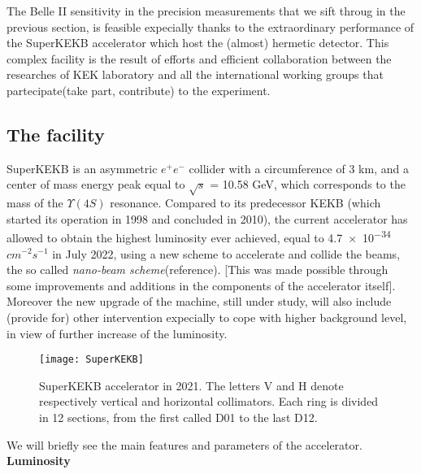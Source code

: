 
The Belle II sensitivity in the precision measurements that we sift throug in the previous section, is feasible expecially thanks to the extraordinary performance of the SuperKEKB accelerator which host the (almost) hermetic detector. This complex facility is the result of efforts and efficient collaboration between the researches of KEK laboratory and all the international working groups that partecipate(take part, contribute) to the experiment.

\subsection{The facility}

SuperKEKB is an asymmetric $e^{+}e^{-}$ collider with a circumference of 3 km, and a center of mass energy peak equal to  $\sqrt{s}$ = 10.58 GeV, which corresponds to the mass of the $\Upsilon(4S)$ resonance.
Compared to its predecessor KEKB (which started its operation in 1998 and concluded in 2010), the current accelerator has allowed to obtain the highest luminosity ever achieved, equal to \num{4.7e-34} $cm^{-2}s^{-1}$ in July 2022, using a new scheme to accelerate and collide the beams, the so called \textit{nano-beam scheme}(reference). [This was made possible through some improvements and additions in the components of the accelerator itself]. Moreover the new upgrade of the machine, still under study, will also include (provide for) other intervention expecially to cope with higher background level, in view of further increase of the luminosity.

\begin{figure}[h!]
\centering
\texttt{[image: SuperKEKB]}
\caption{SuperKEKB accelerator in 2021. The letters V and H denote respectively vertical and horizontal collimators. Each ring is divided in 12 sections, from the first called D01 to the last D12.}
\label{fig:superkekb}
\end{figure}


We will briefly see the main features and parameters of the accelerator.\\

\textbf{Luminosity}\\

